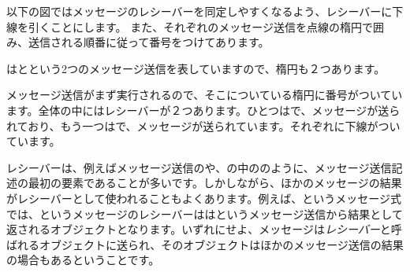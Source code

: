 \documentclass[a4paper,10pt,twoside]{book}
\begin{document}


以下の図ではメッセージのレシーバーを同定しやすくなるよう、レシーバーに下線を引くことにします。
また、それぞれのメッセージ送信を点線の楕円で囲み、送信される順番に従って番号をつけてあります。


はとという2つのメッセージ送信を表していますので、楕円も２つあります。

メッセージ送信がまず実行されるので、そこについている楕円に番号がついています。全体の中にはレシーバーが２つあります。ひとつはで、メッセージが送られており、もう一つはで、メッセージが送られています。それぞれに下線がついています。

レシーバーは、例えばメッセージ送信のや、の中ののように、メッセージ送信記述の最初の要素であることが多いです。しかしながら、ほかのメッセージの結果がレシーバーとして使われることもよくあります。例えば、というメッセージ式では、というメッセージのレシーバーははというメッセージ送信から結果として返されるオブジェクトとなります。いずれにせよ、メッセージは\emph{レシーバー}と呼ばれるオブジェクトに送られ、そのオブジェクトはほかのメッセージ送信の結果の場合もあるということです。
\end{document}
